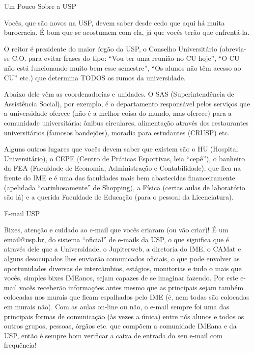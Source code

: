 \begin{secao}{Um Pouco Sobre a USP}

Vocês, que são novos na USP, devem saber desde cedo que aqui há muita
burocracia. É bom que se acostumem com ela, já que vocês terão que enfrentá-la.

O reitor é presidente do maior órgão da USP, o Conselho Universitário (abrevia-se
C.O. para evitar frases do tipo: ``Vou ter uma reunião no CU hoje'', ``O CU não
está funcionando muito bem esse semestre'', ``Os alunos não têm acesso ao CU''
etc.) que determina TODOS os rumos da universidade.

Abaixo dele vêm as coordenadorias e unidades. O SAS (Superintendência de Assistência Social),
por exemplo, é o departamento responsável pelos serviços
que a universidade oferece (não é a melhor coisa do mundo, mas oferece) para a
comunidade universitária: ônibus circulares, alimentação através dos restaurantes
universitários (famosos bandejões), moradia para estudantes (CRUSP) etc.

Alguns outros lugares que vocês devem saber que existem são o HU (Hospital
Universitário), o CEPE (Centro de Práticas Esportivas, leia ``cepê''), o banheiro
da FEA (Faculdade de Economia, Administração e Contabilidade), que fica na
frente do IME e é uma das faculdades mais bem abastecidas financeiramente
(apelidada ``carinhosamente'' de Shopping), a Física (certas aulas de laboratório são lá)
 e a querida Faculdade de Educação (para o pessoal da Licenciatura).

\begin{subsecao}{E-mail USP}

Bixes, atenção e cuidado ao e-mail que vocês criaram (ou vão criar)! É um
email@usp.br, do sistema ``oficial'' de e-mails da USP, o que significa que é
através dele que a Universidade, o Jupiterweb, a diretoria do IME, o CAMat e
alguns desocupados lhes enviarão comunicados oficiais, o que pode envolver as
oportunidades diversas de intercâmbios, estágios, monitorias e tudo o mais que
vocês, simples bixes IMEanos, sejam capazes de se imaginar fazendo. Por este e-mail
vocês receberão informações antes mesmo que as principais sejam também colocadas
nos murais que ficam espalhados pelo IME (é, nem todas são colocadas em murais não).
Com as aulas on-line ou não, o e-mail sempre foi uma das principais formas de
comunicação (às vezes a única) entre nós alunos e todos os outros grupos, pessoas,
órgãos etc. que compõem a comunidade IMEana e da USP, então é sempre bom verificar a
caixa de entrada do seu  e-mail com frequência!


\end{subsecao}
\end{secao}
